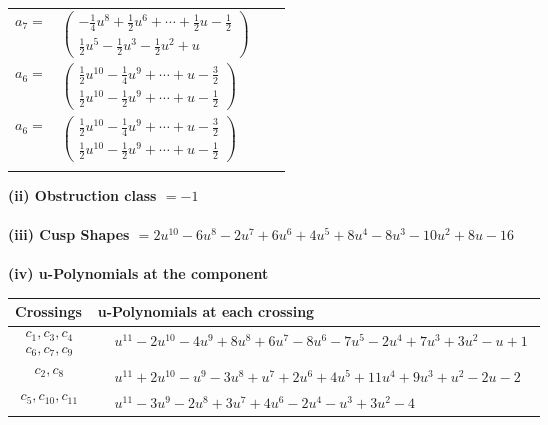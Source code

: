 \documentclass[1p]{elsarticle_modified}
\theoremstyle{definition}
\begin{document}
\begin{tabular}{m{7pt} m{180pt} m{7pt} m{180pt} }
\flushright $a_{7}=$&$\begin{pmatrix}-\frac{1}{4} u^8+\frac{1}{2} u^6+\cdots+\frac{1}{2} u-\frac{1}{2}\\\frac{1}{2} u^5-\frac{1}{2} u^3-\frac{1}{2} u^2+u\end{pmatrix}$ \\
\flushright $a_{6}=$&$\begin{pmatrix}\frac{1}{2} u^{10}-\frac{1}{4} u^9+\cdots+u-\frac{3}{2}\\\frac{1}{2} u^{10}-\frac{1}{2} u^9+\cdots+u-\frac{1}{2}\end{pmatrix}$\\ \flushright $a_{6}=$&$\begin{pmatrix}\frac{1}{2} u^{10}-\frac{1}{4} u^9+\cdots+u-\frac{3}{2}\\\frac{1}{2} u^{10}-\frac{1}{2} u^9+\cdots+u-\frac{1}{2}\end{pmatrix}$\\&\end{tabular}
\flushleft \textbf{(ii) Obstruction class $= -1$}\\~\\
\flushleft \textbf{(iii) Cusp Shapes $= 2 u^{10}-6 u^8-2 u^7+6 u^6+4 u^5+8 u^4-8 u^3-10 u^2+8 u-16$}\\~\\
\newpage\renewcommand{\arraystretch}{1}
\flushleft \textbf{(iv) u-Polynomials at the component}\newline \\
\begin{tabular}{m{50pt}|m{274pt}}
Crossings & \hspace{64pt}u-Polynomials at each crossing \\
\hline $$\begin{aligned}c_{1},c_{3},c_{4}\\c_{6},c_{7},c_{9}\end{aligned}$$&$\begin{aligned}
&u^{11}-2 u^{10}-4 u^9+8 u^8+6 u^7-8 u^6-7 u^5-2 u^4+7 u^3+3 u^2- u+1
\end{aligned}$\\
\hline $$\begin{aligned}c_{2},c_{8}\end{aligned}$$&$\begin{aligned}
&u^{11}+2 u^{10}- u^9-3 u^8+u^7+2 u^6+4 u^5+11 u^4+9 u^3+u^2-2 u-2
\end{aligned}$\\
\hline $$\begin{aligned}c_{5},c_{10},c_{11}\end{aligned}$$&$\begin{aligned}
&u^{11}-3 u^9-2 u^8+3 u^7+4 u^6-2 u^4- u^3+3 u^2-4
\end{aligned}$\\
\hline
\end{tabular}\\~\\
\end{document}
